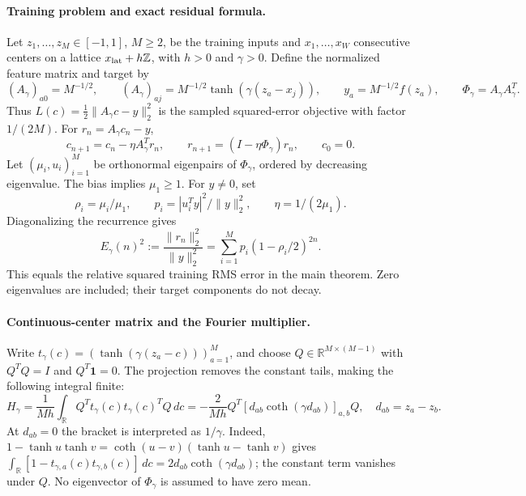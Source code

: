 \paragraph{Training problem and exact residual formula.}
Let $z_1,\ldots,z_M\in[-1,1]$, $M\ge2$, be the training inputs and
$x_1,\ldots,x_W$ consecutive centers on a lattice $x_{\rm lat}+h\mathbb Z$,
with $h>0$ and $\gamma>0$. Define the normalized feature matrix and target by
\begin{equation}
 (A_\gamma)_{a0}=M^{-1/2},\qquad
 (A_\gamma)_{aj}=M^{-1/2}\tanh(\gamma(z_a-x_j)),\qquad
 y_a=M^{-1/2}f(z_a),\qquad \Phi_\gamma=A_\gamma A_\gamma^T.
 \label{eq:note-feature-definition}
\end{equation}
Thus $L(c)=\tfrac12\|A_\gamma c-y\|_2^2$ is the sampled squared-error
objective with factor $1/(2M)$. For $r_n=A_\gamma c_n-y$,
\begin{equation}
 c_{n+1}=c_n-\eta A_\gamma^Tr_n,
 \qquad r_{n+1}=(I-\eta\Phi_\gamma)r_n,
 \qquad c_0=0.
 \label{eq:note-residual-recurrence}
\end{equation}
Let $(\mu_i,u_i)_{i=1}^M$ be orthonormal eigenpairs of $\Phi_\gamma$,
ordered by decreasing eigenvalue. The bias implies $\mu_1\ge1$.
For $y\ne0$, set
\begin{equation}
 \rho_i=\mu_i/\mu_1,\qquad
 p_i=|u_i^Ty|^2/\|y\|_2^2,\qquad \eta=1/(2\mu_1).
 \label{eq:note-target-weights}
\end{equation}
Diagonalizing the recurrence gives
\begin{equation}
 E_\gamma(n)^2:=\frac{\|r_n\|_2^2}{\|y\|_2^2}
 =\sum_{i=1}^M p_i(1-\rho_i/2)^{2n}.
 \label{eq:note-exact-spectral-error}
\end{equation}
This equals the relative squared training RMS error in the main theorem.
Zero eigenvalues are included; their target components do not decay.

\paragraph{Continuous-center matrix and the Fourier multiplier.}
Write $t_\gamma(c)=(\tanh(\gamma(z_a-c)))_{a=1}^M$, and choose
$Q\in\mathbb R^{M\times(M-1)}$ with $Q^TQ=I$ and $Q^T\mathbf1=0$.
The projection removes the constant tails, making the following integral finite:
\begin{equation}
 H_\gamma=\frac1{Mh}\int_{\mathbb R}
 Q^Tt_\gamma(c)t_\gamma(c)^TQ\,dc
 =-\frac2{Mh}Q^T[d_{ab}\coth(\gamma d_{ab})]_{a,b}Q,
 \quad d_{ab}=z_a-z_b.
 \label{eq:note-integral-matrix}
\end{equation}
At $d_{ab}=0$ the bracket is interpreted as $1/\gamma$.
Indeed, $1-\tanh u\tanh v=\coth(u-v)(\tanh u-\tanh v)$ gives
$\int_{\mathbb R}[1-t_{\gamma,a}(c)t_{\gamma,b}(c)]\,dc
=2d_{ab}\coth(\gamma d_{ab})$; the constant term vanishes under $Q$.
No eigenvector of $\Phi_\gamma$ is assumed to have zero mean.

